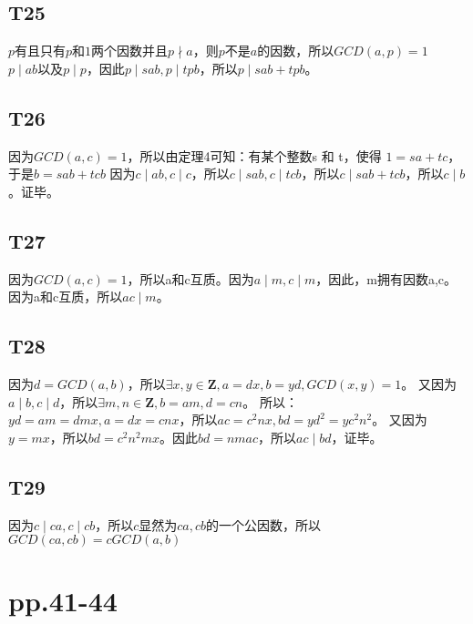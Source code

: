 \documentclass{article}
\begin{document}
\subsection{T25}
$p$有且只有$p$和$1$两个因数并且$p \nmid a$，则$p$不是$a$的因数，所以$GCD(a, p) = 1$\\
$p \mid ab$以及$p \mid p$，因此$p \mid sab, p \mid tpb$，所以$p \mid sab + tpb$。

\subsection{T26}
因为$GCD(a, c) = 1$，所以由定理4可知：有某个整数s 和 t，使得 $1 = sa + tc$，于是$b = sab + tcb$
因为$c \mid ab, c \mid c$，所以$c \mid sab, c \mid tcb$，所以$c \mid sab + tcb$，所以$c \mid b$。证毕。

\subsection{T27}
因为$GCD(a,c) = 1$，所以a和c互质。因为$a \mid m, c \mid m$，因此，m拥有因数a,c。因为a和c互质，所以$ac \mid m$。

\subsection{T28}
因为$d = GCD(a,b)$，所以$\exists x,y \in \mathbf{Z}, a = dx, b = yd, GCD(x,y) = 1$。
又因为$a \mid b, c\mid d$，所以$\exists m,n \in \mathbf{Z}, b = am, d = cn$。
所以：$yd = am = dmx, a = dx = cnx$，所以$ac = c^2nx, bd = yd^2 = yc^2n^2$。
又因为$y = mx$，所以$bd = c^2n^2mx$。因此$bd = nmac$，所以$ac \mid bd$，证毕。

\subsection{T29}
因为$c \mid ca,c \mid cb$，所以$c$显然为$ca,cb$的一个公因数，所以$GCD(ca,cb) = cGCD(a,b)$

\section{pp.41-44}
\end{document}
